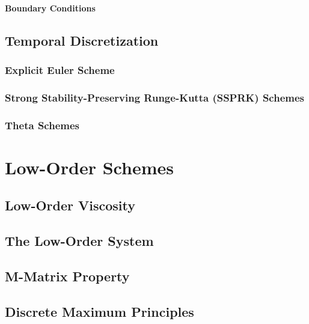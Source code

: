     \paragraph{Boundary Conditions}
    
\subsection{Temporal Discretization\label{sec:temporal_discretization}}
  \subsubsection{Explicit Euler Scheme}
    
  \subsubsection{Strong Stability-Preserving Runge-Kutta (SSPRK)
    Schemes\label{sec:ssprk}}
    
  \subsubsection{Theta Schemes\label{sec:theta}}
    
\section{Low-Order Schemes}  
\subsection{Low-Order Viscosity\label{sec:low_order_viscosity}}
  
\subsection{The Low-Order System\label{sec:low_order_system}}
  
\subsection{M-Matrix Property}
  
\subsection{Discrete Maximum Principles\label{sec:DMP}}
  
  
  
